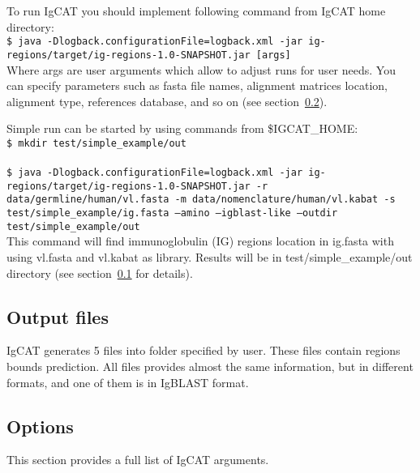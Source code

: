 \documentclass{scrartcl}
\newcommand{\shellcmd}[1]{\\\indent\indent\texttt{\footnotesize #1}\\}
\begin{document}
To run IgCAT you should implement following command from IgCAT home directory:
\shellcmd{\$ java -Dlogback.configurationFile=logback.xml -jar
ig-regions/target/ig-regions-1.0-SNAPSHOT.jar [args]}
Where args are user arguments which allow to adjust runs for user needs.
You can specify parameters such as fasta file names, alignment matrices location,
alignment type, references database, and so on (see section~\ref{subsec:options}).

Simple run can be started by using commands from \$IGCAT\_HOME:
\shellcmd{\$ mkdir test/simple\_example/out}
\shellcmd{\$ java -Dlogback.configurationFile=logback.xml
-jar ig-regions/target/ig-regions-1.0-SNAPSHOT.jar -r data/germline/human/vl.fasta
-m data/nomenclature/human/vl.kabat -s test/simple\_example/ig.fasta --amino --igblast-like
--outdir test/simple\_example/out}
This command will find immunoglobulin (IG) regions location in ig.fasta with using vl.fasta and vl.kabat as library.
Results will be in test/simple\_example/out directory (see section~\ref{subsec:files} for details).

\subsection{Output files}
\label{subsec:files}
IgCAT generates 5 files into folder specified by user.
These files contain regions bounds prediction.
All files provides almost the same information, but in different formats,
and one of them is in IgBLAST format\cite{Ye2013}.


\subsection{Options}
\label{subsec:options}
This section provides a full list of IgCAT arguments.
\end{document}
